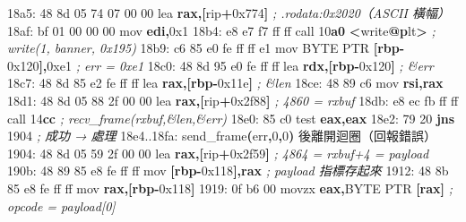 \documentclass[10pt,a4paper]{article}
\newenvironment{Shaded}{\begin{snugshade}}{\end{snugshade}}
\newcommand{\BaseNTok}[1]{\textcolor[rgb]{0.00,0.00,0.81}{#1}}
\newcommand{\BuiltInTok}[1]{#1}
\newcommand{\CommentTok}[1]{\textcolor[rgb]{0.56,0.35,0.01}{\textit{#1}}}
\newcommand{\ControlFlowTok}[1]{\textcolor[rgb]{0.13,0.29,0.53}{\textbf{#1}}}
\newcommand{\DataTypeTok}[1]{\textcolor[rgb]{0.13,0.29,0.53}{#1}}
\newcommand{\DecValTok}[1]{\textcolor[rgb]{0.00,0.00,0.81}{#1}}
\newcommand{\ErrorTok}[1]{\textcolor[rgb]{0.64,0.00,0.00}{\textbf{#1}}}
\newcommand{\FunctionTok}[1]{\textcolor[rgb]{0.13,0.29,0.53}{\textbf{#1}}}
\newcommand{\KeywordTok}[1]{\textcolor[rgb]{0.13,0.29,0.53}{\textbf{#1}}}
\newcommand{\NormalTok}[1]{#1}
\newcommand{\OperatorTok}[1]{\textcolor[rgb]{0.81,0.36,0.00}{\textbf{#1}}}
\renewenvironment{Shaded}{%
  \def\FrameCommand{\fboxsep=3.2pt\colorbox{shadecolor}}%
  \MakeFramed{\advance\hsize-\width\FrameRestore\small}%
}{%
  \endMakeFramed
}
\begin{document}
\begin{Shaded}
\begin{Highlighting}[]
\NormalTok{18a5: 48 8d 05 74 07 00 00   }\BuiltInTok{lea}    \KeywordTok{rax}\OperatorTok{,[}\NormalTok{rip}\OperatorTok{+}\BaseNTok{0x774}\OperatorTok{]}           \CommentTok{; .rodata:0x2020（ASCII 橫幅）}
\NormalTok{18af: bf }\DecValTok{01} \DecValTok{00} \DecValTok{00} \DecValTok{00}\NormalTok{         mov    }\KeywordTok{edi}\OperatorTok{,}\BaseNTok{0x1}
\NormalTok{18b4: e8 e7 f7 ff ff         call   }\DecValTok{10}\ErrorTok{a0} \OperatorTok{\textless{}}\NormalTok{write}\FunctionTok{@}\ErrorTok{p}\NormalTok{lt}\OperatorTok{\textgreater{}}          \CommentTok{; write(1, banner, 0x195)}
\NormalTok{18b9: c6 }\DecValTok{85}\NormalTok{ e0 fe ff ff e1   mov    }\DataTypeTok{BYTE} \DataTypeTok{PTR} \OperatorTok{[}\KeywordTok{rbp}\OperatorTok{{-}}\BaseNTok{0x120}\OperatorTok{],}\BaseNTok{0xe1} \CommentTok{; err = 0xe1}
\NormalTok{18c0: 48 8d 95 e0 fe ff ff   lea    }\KeywordTok{rdx}\OperatorTok{,[}\KeywordTok{rbp}\OperatorTok{{-}}\BaseNTok{0x120}\OperatorTok{]}           \CommentTok{; \&err}
\NormalTok{18c7: 48 8d 85 e2 fe ff ff   lea    }\KeywordTok{rax}\OperatorTok{,[}\KeywordTok{rbp}\OperatorTok{{-}}\BaseNTok{0x11e}\OperatorTok{]}           \CommentTok{; \&len}
\NormalTok{18ce: 48 89 c6               mov    }\KeywordTok{rsi}\OperatorTok{,}\KeywordTok{rax}
\NormalTok{18d1: 48 8d 05 88 2f 00 00   }\BuiltInTok{lea}    \KeywordTok{rax}\OperatorTok{,[}\NormalTok{rip}\OperatorTok{+}\BaseNTok{0x2f88}\OperatorTok{]}          \CommentTok{; 4860 = rxbuf}
\NormalTok{18db: e8 ec fb ff ff         call   }\DecValTok{14}\ErrorTok{cc}                      \CommentTok{; recv\_frame(rxbuf,\&len,\&err)}
\NormalTok{18e0: 85 c0                  test   }\KeywordTok{eax}\OperatorTok{,}\KeywordTok{eax}
\NormalTok{18e2: 79 20                  }\ControlFlowTok{jns}    \DecValTok{1904}                      \CommentTok{; 成功 → 處理}
\NormalTok{18e4..18fa: send\_frame}\OperatorTok{(}\NormalTok{err}\OperatorTok{,}\DecValTok{0}\OperatorTok{,}\DecValTok{0}\OperatorTok{)}\NormalTok{ 後離開迴圈（回報錯誤）}
\NormalTok{1904: 48 8d 05 59 2f 00 00   }\BuiltInTok{lea}    \KeywordTok{rax}\OperatorTok{,[}\NormalTok{rip}\OperatorTok{+}\BaseNTok{0x2f59}\OperatorTok{]}          \CommentTok{; 4864 = rxbuf+4 = payload}
\NormalTok{190b: 48 89 85 e8 fe ff ff   mov    }\OperatorTok{[}\KeywordTok{rbp}\OperatorTok{{-}}\BaseNTok{0x118}\OperatorTok{],}\KeywordTok{rax}           \CommentTok{; payload 指標存起來}
\NormalTok{1912: 48 8b 85 e8 fe ff ff   mov    }\KeywordTok{rax}\OperatorTok{,[}\KeywordTok{rbp}\OperatorTok{{-}}\BaseNTok{0x118}\OperatorTok{]}
\NormalTok{1919: 0f b6 }\DecValTok{00}\NormalTok{               movzx  }\KeywordTok{eax}\OperatorTok{,}\DataTypeTok{BYTE} \DataTypeTok{PTR} \OperatorTok{[}\KeywordTok{rax}\OperatorTok{]}        \CommentTok{; opcode = payload[0]}

\end{Highlighting}
\end{Shaded}
\end{document}
